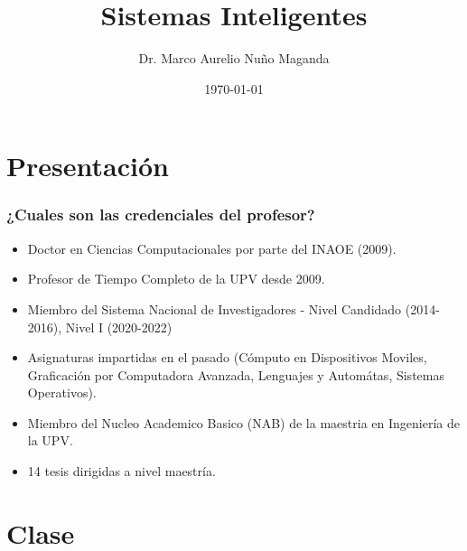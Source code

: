 \documentclass[aspectratio=169]{beamer}
\title[SI]{Sistemas Inteligentes} %
\author{Dr. Marco Aurelio Nuño Maganda} %
\institute[UPV] %
{
Universidad Politecnica de Victoria \\ %
Ingenieria en Tecnologias de la Informacion \\ %
Cuatrimestre Enero-Abril 2022  \\ %
\medskip
\textit{mnunom@upv.edu.mx} %
}
\date{\today} %
\begin{document}
\begin{frame}
\titlepage %
\end{frame}




\section{Presentación} 

\begin{frame}

\frametitle{¿Cuales son las credenciales del profesor?}
\begin{itemize}
\item Doctor en Ciencias Computacionales por parte del INAOE (2009).  
\item Profesor de Tiempo Completo de la UPV desde 2009.  
\item Miembro del Sistema Nacional de Investigadores - Nivel Candidado (2014-2016), Nivel I (2020-2022)
\item Asignaturas impartidas en el pasado (Cómputo en Dispositivos Moviles, Graficación por Computadora Avanzada, Lenguajes y Automátas, Sistemas Operativos).
\item Miembro del Nucleo Academico Basico (NAB) de la maestria en Ingeniería de la UPV.
\item 14 tesis dirigidas a nivel maestría.
\end{itemize}


\end{frame}


\section{Clase}
\end{document}
